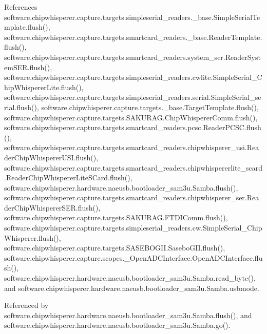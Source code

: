 References software.\+chipwhisperer.\+capture.\+targets.\+simpleserial\+\_\+readers.\+\_\+base.\+Simple\+Serial\+Template.\+flush(), software.\+chipwhisperer.\+capture.\+targets.\+smartcard\+\_\+readers.\+\_\+base.\+Reader\+Template.\+flush(), software.\+chipwhisperer.\+capture.\+targets.\+smartcard\+\_\+readers.\+system\+\_\+ser.\+Reader\+System\+S\+E\+R.\+flush(), software.\+chipwhisperer.\+capture.\+targets.\+simpleserial\+\_\+readers.\+cwlite.\+Simple\+Serial\+\_\+\+Chip\+Whisperer\+Lite.\+flush(), software.\+chipwhisperer.\+capture.\+targets.\+simpleserial\+\_\+readers.\+serial.\+Simple\+Serial\+\_\+serial.\+flush(), software.\+chipwhisperer.\+capture.\+targets.\+\_\+base.\+Target\+Template.\+flush(), software.\+chipwhisperer.\+capture.\+targets.\+S\+A\+K\+U\+R\+A\+G.\+Chip\+Whisperer\+Comm.\+flush(), software.\+chipwhisperer.\+capture.\+targets.\+smartcard\+\_\+readers.\+pcsc.\+Reader\+P\+C\+S\+C.\+flush(), software.\+chipwhisperer.\+capture.\+targets.\+smartcard\+\_\+readers.\+chipwhisperer\+\_\+usi.\+Reader\+Chip\+Whisperer\+U\+S\+I.\+flush(), software.\+chipwhisperer.\+capture.\+targets.\+smartcard\+\_\+readers.\+chipwhispererlite\+\_\+scard.\+Reader\+Chip\+Whisperer\+Lite\+S\+Card.\+flush(), software.\+chipwhisperer.\+hardware.\+naeusb.\+bootloader\+\_\+sam3u.\+Samba.\+flush(), software.\+chipwhisperer.\+capture.\+targets.\+smartcard\+\_\+readers.\+chipwhisperer\+\_\+ser.\+Reader\+Chip\+Whisperer\+S\+E\+R.\+flush(), software.\+chipwhisperer.\+capture.\+targets.\+S\+A\+K\+U\+R\+A\+G.\+F\+T\+D\+I\+Comm.\+flush(), software.\+chipwhisperer.\+capture.\+targets.\+simpleserial\+\_\+readers.\+cw.\+Simple\+Serial\+\_\+\+Chip\+Whisperer.\+flush(), software.\+chipwhisperer.\+capture.\+targets.\+S\+A\+S\+E\+B\+O\+G\+I\+I.\+Sasebo\+G\+I\+I.\+flush(), software.\+chipwhisperer.\+capture.\+scopes.\+\_\+\+Open\+A\+D\+C\+Interface.\+Open\+A\+D\+C\+Interface.\+flush(), software.\+chipwhisperer.\+hardware.\+naeusb.\+bootloader\+\_\+sam3u.\+Samba.\+read\+\_\+byte(), and software.\+chipwhisperer.\+hardware.\+naeusb.\+bootloader\+\_\+sam3u.\+Samba.\+usbmode.



Referenced by software.\+chipwhisperer.\+hardware.\+naeusb.\+bootloader\+\_\+sam3u.\+Samba.\+flush(), and software.\+chipwhisperer.\+hardware.\+naeusb.\+bootloader\+\_\+sam3u.\+Samba.\+go().



